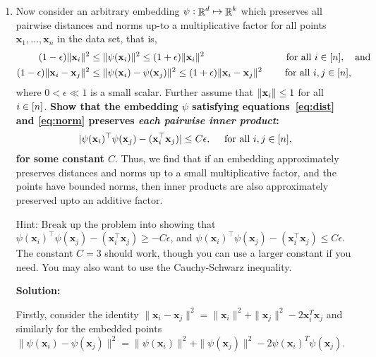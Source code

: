 \documentclass{article}
\DeclareMathOperator{\R}{\mathbb{R}}
\renewcommand{\vec}[1]{\boldsymbol{\mathbf{#1}}}
\newenvironment{solution}{\color{blue} \smallskip \textbf{Solution:}}{}
\begin{document}
\begin{enumerate}

\item Now consider an arbitrary  embedding $\psi:\R^\dims \mapsto \R^k$ 
which preserves all pairwise distances and norms up-to a multiplicative factor for all points $\vec x_1,\dots,\vec x_n$ in the data set, 
that is,
\begin{align}
	(1-\epsilon) \Vert \vec x_i \Vert^2 &\leq \Vert \psi(\vec x_i) \Vert^2 \leq (1+\epsilon) \Vert \vec x_i \Vert^2 \quad &\text{ for all } i \in [\num], \quad\text{and} \label{eq:norm}\\
	(1-\epsilon) \Vert\vec x_i - \vec x_j \Vert^2 &\leq  \Vert \psi(\vec x_i) - \psi(\vec x_j) \Vert^2 
	\leq (1+\epsilon) \Vert\vec x_i - \vec x_j \Vert^2 \quad &\text{ for all } i, j \in [\num], \quad \quad \label{eq:dist}
\end{align}
where $0<\epsilon \ll 1$ is a small scalar.
Further assume that $\norm{\vec{x}_i} \leq 1$ for all $i \in [n]$.
{\bf Show that the embedding $\psi$ satisfying equations~\eqref{eq:dist} and \eqref{eq:norm} 
preserves \emph{each pairwise inner product}:}
\begin{align}
\label{eq:psi_iprod}
	\vert \psi(\vec x_i)^\top\psi(\vec x_j) - (\vec x_i^\top \vec x_j) \vert  \leq C\epsilon, \quad \text{ for all } i, j \in [\num],
\end{align}
{\bf for some constant $C$}.
Thus, we find that if an embedding  approximately preserves distances and norms up to a small multiplicative factor, 
and the points have bounded norms, then 
inner products are also approximately preserved upto an additive factor.


Hint: Break up the problem into showing that $\psi(\vec x_i)^\top\psi(\vec x_j) - (\vec x_i^\top \vec x_j) \ge -C\epsilon $, and $\psi(\vec x_i)^\top\psi(\vec x_j) - (\vec x_i^\top \vec x_j) \le C\epsilon$. The constant $C = 3$ should work, though you can use a larger constant if you need. You may also want to use the Cauchy-Schwarz inequality.

\begin{solution}

Firstly, consider the identity \( \|\mathbf{x}_i - \mathbf{x}_j\|^2 = \|\mathbf{x}_i\|^2 + \|\mathbf{x}_j\|^2 - 2 \mathbf{x}_i^T \mathbf{x}_j \) and similarly for the embedded points \( \|\psi(\mathbf{x}_i) - \psi(\mathbf{x}_j)\|^2 = \|\psi(\mathbf{x}_i)\|^2 + \|\psi(\mathbf{x}_j)\|^2 - 2 \psi(\mathbf{x}_i)^T \psi(\mathbf{x}_j) \).\\


\end{solution}
\end{enumerate}
\end{document}
